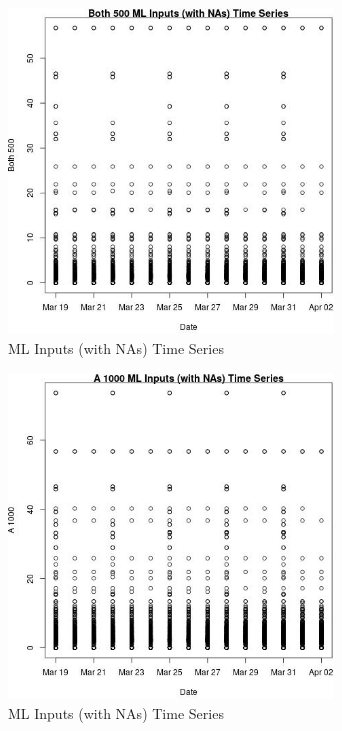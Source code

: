 \begin{figure} 
\centering  
\includegraphics[width=0.77\textwidth]{Code_Outputs/Report_ML_input_PM25_Step4_part_e_de_duplicated_aveswNAs_Both_500vDate.jpg} 
\caption{\label{fig:Report_ML_input_PM25_Step4_part_e_de_duplicated_aveswNAsBoth_500vDate}ML Inputs (with NAs) Time Series} 
\end{figure} 
 

\begin{figure} 
\centering  
\includegraphics[width=0.77\textwidth]{Code_Outputs/Report_ML_input_PM25_Step4_part_e_de_duplicated_aveswNAs_A_1000vDate.jpg} 
\caption{\label{fig:Report_ML_input_PM25_Step4_part_e_de_duplicated_aveswNAsA_1000vDate}ML Inputs (with NAs) Time Series} 
\end{figure} 
 

